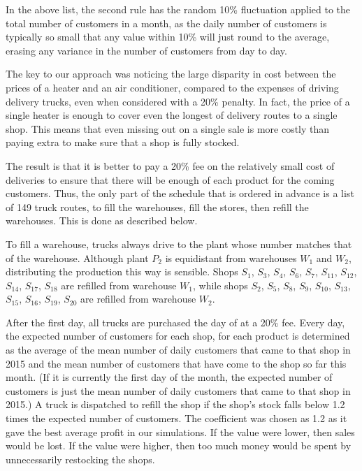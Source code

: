 \begin{paper}
In the above list, the second rule has the random 10\% fluctuation applied to
the total number of customers in a month, as the daily number of customers is
typically so small that any value within 10\% will just round to the average,
erasing any variance in the number of customers from day to day.


The key to our approach was noticing the large disparity in cost between the
prices of a heater and an air conditioner, compared to the expenses of driving
delivery trucks, even when considered with a 20\% penalty.
In fact, the price of a single heater is enough to cover even the longest of
delivery routes to a single shop.
This means that even missing out on a single sale is more costly than paying 
extra to make sure that a shop is fully stocked.

The result is that it is better to pay a 20\% fee on the relatively small cost
of deliveries to ensure that there will be enough of each product for the coming
customers.
Thus, the only part of the schedule that is ordered in advance is a list of 149 truck
routes, to fill the warehouses, fill the stores, then refill the warehouses.
This is done as described below.

To fill a warehouse, trucks always drive to the plant whose number matches that
of the warehouse.
Although plant $P_2$ is equidistant from warehouses $W_1$ and $W_2$, distributing the production
this way is sensible.
Shops $S_1$, $S_3$, $S_4$, $S_6$, $S_7$, $S_{11}$, $S_{12}$, $S_{14}$, $S_{17}$, $S_{18}$ are refilled from warehouse $W_1$, while shops $S_2$, $S_5$, $S_8$, $S_9$, $S_{10}$, $S_{13}$, $S_{15}$, $S_{16}$, $S_{19}$, $S_{20}$ are refilled from warehouse $W_2$.

After the first day, all trucks are purchased the day of at a 20\% fee.
Every day, the expected number of customers for each shop, for each product is determined as the average of 
the mean number of daily customers that came to that shop in 2015 and the mean number of customers that have come to the
shop so far this month.
(If it is currently the first day of the month, the expected number of customers is just the mean number of daily customers that came to that shop in 2015.)
A truck is dispatched to refill the shop if the shop's stock falls below 1.2 times the expected number of customers.
The coefficient was chosen as 1.2 as it gave the best average profit in our simulations.
If the value were lower, then sales would be lost.
If the value were higher, then too much money would be spent by unnecessarily restocking the shops.


\end{paper}
